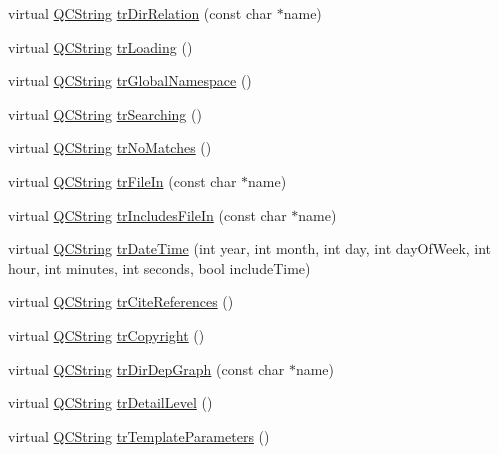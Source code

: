 \begin{DoxyCompactItemize}
\item 
virtual \hyperlink{class_q_c_string}{Q\-C\-String} \hyperlink{class_translator_russian_a38a56cc8bcc5323be9d1f09b0daa5933}{tr\-Dir\-Relation} (const char $\ast$name)
\item 
virtual \hyperlink{class_q_c_string}{Q\-C\-String} \hyperlink{class_translator_russian_aca8cf7409bceb9f8e6af47f637da5457}{tr\-Loading} ()
\item 
virtual \hyperlink{class_q_c_string}{Q\-C\-String} \hyperlink{class_translator_russian_aa9fd39641e570165be20c71c67481fee}{tr\-Global\-Namespace} ()
\item 
virtual \hyperlink{class_q_c_string}{Q\-C\-String} \hyperlink{class_translator_russian_aea79f5912e787bbb2c441223ccd382c6}{tr\-Searching} ()
\item 
virtual \hyperlink{class_q_c_string}{Q\-C\-String} \hyperlink{class_translator_russian_a240e49b617153456e0f29bef561cc10f}{tr\-No\-Matches} ()
\item 
virtual \hyperlink{class_q_c_string}{Q\-C\-String} \hyperlink{class_translator_russian_acf964d17bad4c55c393193fe9708575f}{tr\-File\-In} (const char $\ast$name)
\item 
virtual \hyperlink{class_q_c_string}{Q\-C\-String} \hyperlink{class_translator_russian_a53f57c6e2aa0b9dc09bc47b3746d3481}{tr\-Includes\-File\-In} (const char $\ast$name)
\item 
virtual \hyperlink{class_q_c_string}{Q\-C\-String} \hyperlink{class_translator_russian_a19c43671f677ae0445fca1fe7a5f62cc}{tr\-Date\-Time} (int year, int month, int day, int day\-Of\-Week, int hour, int minutes, int seconds, bool include\-Time)
\item 
virtual \hyperlink{class_q_c_string}{Q\-C\-String} \hyperlink{class_translator_russian_ae43b2c6dbb1637144e32cd13a0d4704c}{tr\-Cite\-References} ()
\item 
virtual \hyperlink{class_q_c_string}{Q\-C\-String} \hyperlink{class_translator_russian_a840474c30dfc2d4e92d1a29c5d1bf343}{tr\-Copyright} ()
\item 
virtual \hyperlink{class_q_c_string}{Q\-C\-String} \hyperlink{class_translator_russian_abbe522be6eed72f54409458a1896323c}{tr\-Dir\-Dep\-Graph} (const char $\ast$name)
\item 
virtual \hyperlink{class_q_c_string}{Q\-C\-String} \hyperlink{class_translator_russian_a138b581235bf64a0338ed25ee0d1ad61}{tr\-Detail\-Level} ()
\item 
virtual \hyperlink{class_q_c_string}{Q\-C\-String} \hyperlink{class_translator_russian_ad9599164391093757c91bbe746f694a5}{tr\-Template\-Parameters} ()

\end{DoxyCompactItemize}
